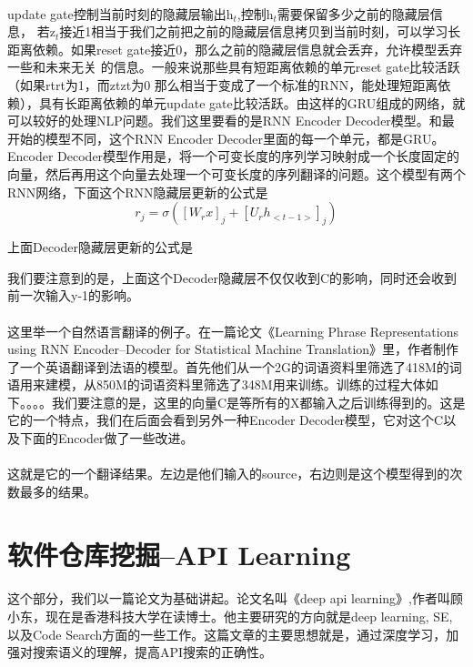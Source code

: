 \documentclass[UTF8]{ctexart}
\begin{document}
			\paragraph{}
			update gate控制当前时刻的隐藏层输出h$_{t}$,控制h$_{t}$需要保留多少之前的隐藏层信息， 若z$_{t}$接近1相当于我们之前把之前的隐藏层信息拷贝到当前时刻，可以学习长距离依赖。如果reset gate接近0，那么之前的隐藏层信息就会丢弃，允许模型丢弃一些和未来无关 的信息。一般来说那些具有短距离依赖的单元reset gate比较活跃（如果rtrt为1，而ztzt为0 那么相当于变成了一个标准的RNN，能处理短距离依赖），具有长距离依赖的单元update gate比较活跃。由这样的GRU组成的网络，就可以较好的处理NLP问题。我们这里要看的是RNN Encoder Decoder模型。和最开始的模型不同，这个RNN Encoder Decoder里面的每一个单元，都是GRU。Encoder Decoder模型作用是，将一个可变长度的序列学习映射成一个长度固定的向量，然后再用这个向量去处理一个可变长度的序列翻译的问题。这个模型有两个RNN网络，下面这个RNN隐藏层更新的公式是
$$r_j=\sigma([W_r x]_j+[U_r h_{<t-1>}]_j) $$

上面Decoder隐藏层更新的公式是

我们要注意到的是，上面这个Decoder隐藏层不仅仅收到C的影响，同时还会收到前一次输入y-1的影响。
			\paragraph{}
			这里举一个自然语言翻译的例子。在一篇论文《Learning Phrase Representations using RNN Encoder–Decoder for Statistical Machine Translation》里，作者制作了一个英语翻译到法语的模型。首先他们从一个2G的词语资料里筛选了418M的词语用来建模，从850M的词语资料里筛选了348M用来训练。训练的过程大体如下。。。。我们要注意的是，这里的向量C是等所有的X都输入之后训练得到的。这是它的一个特点，我们在后面会看到另外一种Encoder Decoder模型，它对这个C以及下面的Encoder做了一些改进。
			\paragraph{}
			这就是它的一个翻译结果。左边是他们输入的source，右边则是这个模型得到的次数最多的结果。
			\section{软件仓库挖掘--API Learning}
			\paragraph{}
			这个部分，我们以一篇论文为基础讲起。论文名叫《deep api learning》,作者叫顾小东，现在是香港科技大学在读博士。他主要研究的方向就是deep learning, SE, 以及Code Search方面的一些工作。这篇文章的主要思想就是，通过深度学习，加强对搜索语义的理解，提高API搜索的正确性。
\end{document}
